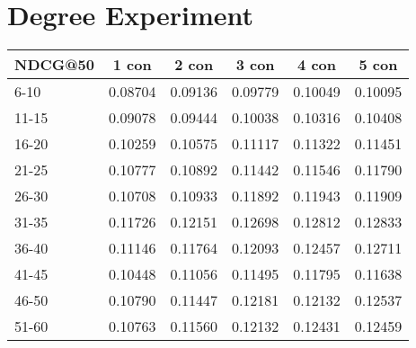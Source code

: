 \section{Degree Experiment}
\begin{table*}[]
    \begin{tabular}{|l|l|l|l|l|l|}
    \hline
    NDCG@50 & \multicolumn{1}{c|}{1 con} & \multicolumn{1}{c|}{2 con} & \multicolumn{1}{c|}{3 con} & \multicolumn{1}{c|}{4 con} & \multicolumn{1}{c|}{5 con} \\ \hline
    6-10    & 0.08704                    & 0.09136                    & 0.09779                    & 0.10049                    & 0.10095                           \\ \hline
    11-15   & 0.09078                    & 0.09444                    & 0.10038                    & 0.10316                    & 0.10408                           \\ \hline
    16-20   & 0.10259                    & 0.10575                    & 0.11117                    & 0.11322                    & 0.11451                           \\ \hline
    21-25   & 0.10777                    & 0.10892                    & 0.11442                    & 0.11546                    & 0.11790                           \\ \hline
    26-30   & 0.10708                    & 0.10933                    & 0.11892                    & 0.11943                    & 0.11909                           \\ \hline
    31-35   & 0.11726                    & 0.12151                    & 0.12698                    & 0.12812                    & 0.12833                           \\ \hline
    36-40   & 0.11146                    & 0.11764                    & 0.12093                    & 0.12457                    & 0.12711                           \\ \hline
    41-45   & 0.10448                    & 0.11056                    & 0.11495                    & 0.11795                    & 0.11638                           \\ \hline
    46-50   & 0.10790                    & 0.11447                    & 0.12181                    & 0.12132                    & 0.12537                           \\ \hline
    51-60   & 0.10763                    & 0.11560                    & 0.12132                    & 0.12431                    & 0.12459                           \\ \hline

\end{tabular}
\end{table*}
